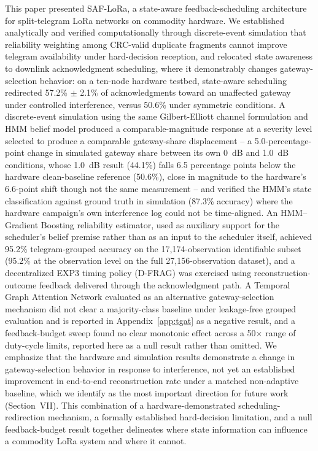 \documentclass[journal]{IEEEtran}
\begin{document}
This paper presented SAF-LoRa, a state-aware feedback-scheduling architecture for split-telegram LoRa networks on commodity hardware. We established analytically and verified computationally through discrete-event simulation that reliability weighting among CRC-valid duplicate fragments cannot improve telegram availability under hard-decision reception, and relocated state awareness to downlink acknowledgment scheduling, where it demonstrably changes gateway-selection behavior: on a ten-node hardware testbed, state-aware scheduling redirected 57.2\% $\pm$ 2.1\% of acknowledgments toward an unaffected gateway under controlled interference, versus 50.6\% under symmetric conditions. A discrete-event simulation using the same Gilbert-Elliott channel formulation and HMM belief model produced a comparable-magnitude response at a severity level selected to produce a comparable gateway-share displacement -- a 5.0-percentage-point change in simulated gateway share between its own 0~dB and 1.0~dB conditions, whose 1.0~dB result (44.1\%) falls 6.5 percentage points below the hardware clean-baseline reference (50.6\%), close in magnitude to the hardware's 6.6-point shift though not the same measurement -- and verified the HMM's state classification against ground truth in simulation (87.3\% accuracy) where the hardware campaign's own interference log could not be time-aligned. An HMM--Gradient Boosting reliability estimator, used as auxiliary support for the scheduler's belief premise rather than as an input to the scheduler itself, achieved 95.2\% telegram-grouped accuracy on the 17{,}174-observation identifiable subset (95.2\% at the observation level on the full 27{,}156-observation dataset), and a decentralized EXP3 timing policy (D-FRAG) was exercised using reconstruction-outcome feedback delivered through the acknowledgment path. A Temporal Graph Attention Network evaluated as an alternative gateway-selection mechanism did not clear a majority-class baseline under leakage-free grouped evaluation and is reported in Appendix~\ref{app:tgat} as a negative result, and a feedback-budget sweep found no clear monotonic effect across a 50$\times$ range of duty-cycle limits, reported here as a null result rather than omitted. We emphasize that the hardware and simulation results demonstrate a change in gateway-selection behavior in response to interference, not yet an established improvement in end-to-end reconstruction rate under a matched non-adaptive baseline, which we identify as the most important direction for future work (Section~VII). This combination of a hardware-demonstrated scheduling-redirection mechanism, a formally established hard-decision limitation, and a null feedback-budget result together delineates where state information can influence a commodity LoRa system and where it cannot.
\end{document}
